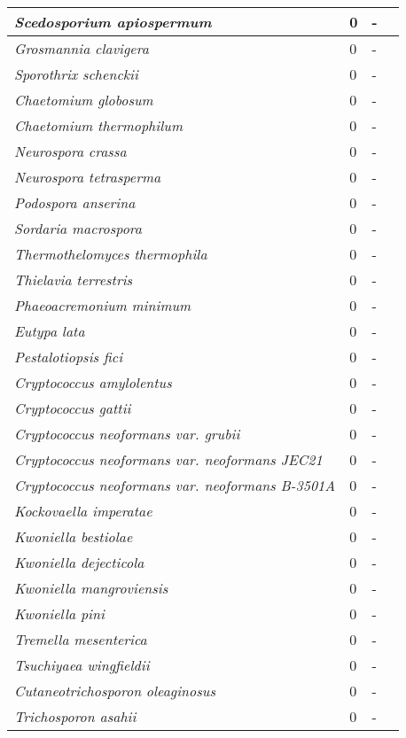 {\begin{longtable}{| L{4cm} | L{2cm}  | L{5cm} | L{4cm} |}
\textit{Scedosporium apiospermum} & 0 & - & \\ \hline
\textit{Grosmannia clavigera} & 0 & - & \\ \hline
\textit{Sporothrix schenckii} & 0 & - & \\ \hline
\textit{Chaetomium globosum} & 0 & - & \\ \hline
\textit{Chaetomium thermophilum} & 0 & - & \\ \hline
\textit{Neurospora crassa} & 0 & - & \\ \hline
\textit{Neurospora tetrasperma} & 0 & - & \\ \hline
\textit{Podospora anserina} & 0 & - & \\ \hline
\textit{Sordaria macrospora} & 0 & - & \\ \hline
\textit{Thermothelomyces thermophila} & 0 & - & \\ \hline
\textit{Thielavia terrestris} & 0 & - & \\ \hline
\textit{Phaeoacremonium minimum} & 0 & - & \\ \hline
\textit{Eutypa lata} & 0 & - & \\ \hline
\textit{Pestalotiopsis fici} & 0 & - & \\ \hline
\textit{Cryptococcus amylolentus} & 0 & - & \\ \hline
\textit{Cryptococcus gattii} & 0 & - & \\ \hline
\textit{Cryptococcus neoformans var. grubii} & 0 & - & \\ \hline
\textit{Cryptococcus neoformans var. neoformans JEC21} & 0 & - & \\ \hline
\textit{Cryptococcus neoformans var. neoformans B-3501A} & 0 & - & \\ \hline
\textit{Kockovaella imperatae} & 0 & - & \\ \hline
\textit{Kwoniella bestiolae} & 0 & - & \\ \hline
\textit{Kwoniella dejecticola} & 0 & - & \\ \hline
\textit{Kwoniella mangroviensis} & 0 & - & \\ \hline
\textit{Kwoniella pini} & 0 & - & \\ \hline
\textit{Tremella mesenterica} & 0 & - & \\ \hline
\textit{Tsuchiyaea wingfieldii} & 0 & - & \\ \hline
\textit{Cutaneotrichosporon oleaginosus} & 0 & - & \\ \hline
\textit{Trichosporon asahii} & 0 & - & \\ \hline

\end{longtable}}
